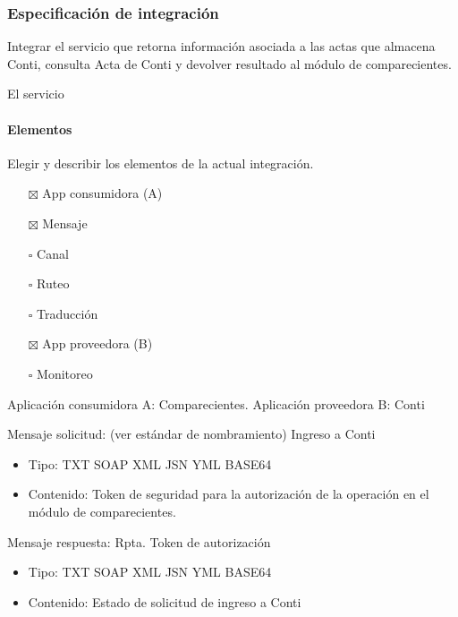 \documentclass[
  paper=a4,
  ,captions=tableheading
]{scrartcl}
\providecommand{\tightlist}{%
  \setlength{\itemsep}{0pt}\setlength{\parskip}{0pt}}
\begin{document}
\subsubsection{Especificación de
integración}\label{sec:especificaciuxf3n-de-integraciuxf3n-2}

Integrar el servicio que retorna información asociada a las actas que
almacena Conti, consulta Acta de Conti y devolver resultado al módulo de
comparecientes.

El servicio

\paragraph{Elementos}\label{sec:elementos-2}

Elegir y describir los elementos de la actual integración.

\begin{itemize}
\tightlist
\item[$\boxtimes$]
  App consumidora (A)
\item[$\boxtimes$]
  Mensaje
\item[$\square$]
  Canal
\item[$\square$]
  Ruteo
\item[$\square$]
  Traducción
\item[$\boxtimes$]
  App proveedora (B)
\item[$\square$]
  Monitoreo
\end{itemize}

Aplicación consumidora A: Comparecientes. Aplicación proveedora B: Conti

Mensaje solicitud: (ver estándar de nombramiento) Ingreso a Conti

\begin{itemize}
\tightlist
\item
  Tipo: TXT \textbar{} SOAP \textbar{} XML \textbar{} JSN \textbar{} YML
  \textbar{} BASE64
\item
  Contenido: Token de seguridad para la autorización de la operación en
  el módulo de comparecientes.
\end{itemize}

Mensaje respuesta: Rpta. Token de autorización

\begin{itemize}
\tightlist
\item
  Tipo: TXT \textbar{} SOAP \textbar{} XML \textbar{} JSN \textbar{} YML
  \textbar{} BASE64
\item
  Contenido: Estado de solicitud de ingreso a Conti
\end{itemize}
\end{document}
